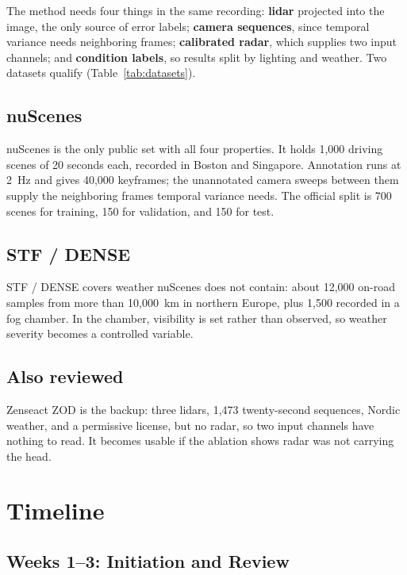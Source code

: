 \documentclass[11pt]{article}
\begin{document}
The method needs four things in the same recording: \textbf{lidar} projected into the image, the only source of error labels; \textbf{camera sequences}, since temporal variance needs neighboring frames; \textbf{calibrated radar}, which supplies two input channels; and \textbf{condition labels}, so results split by lighting and weather. Two datasets qualify (Table~\ref{tab:datasets}).

\subsection{nuScenes}

nuScenes \citep{caesar2020nuscenes} is the only public set with all four properties. It holds 1,000 driving scenes of 20 seconds each, recorded in Boston and Singapore. Annotation runs at 2~Hz and gives 40,000 keyframes; the unannotated camera sweeps between them supply the neighboring frames temporal variance needs. The official split is 700 scenes for training, 150 for validation, and 150 for test.

\subsection{STF / DENSE}

STF / DENSE \citep{bijelic2020seeing} covers weather nuScenes does not contain: about 12,000 on-road samples from more than 10,000~km in northern Europe, plus 1,500 recorded in a fog chamber. In the chamber, visibility is set rather than observed, so weather severity becomes a controlled variable.

\subsection{Also reviewed}

Zenseact ZOD is the backup: three lidars, 1,473 twenty-second sequences, Nordic weather, and a permissive license, but no radar, so two input channels have nothing to read. It becomes usable if the ablation shows radar was not carrying the head.

\section{Timeline}

\subsection{Weeks 1--3: Initiation and Review}
\end{document}
